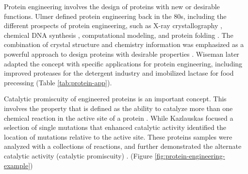 \begin{refsection}
Protein engineering involves the design of proteins with new or desirable
functions. Ulmer  defined protein engineering back
in the 80s, including the different prospects of protein engineering, such as
X-ray crystallography \cite{Takeda2006}, chemical DNA synthesis
\cite{Pannekoek1979}, computational modeling, and protein folding
\cite{Ulmer1983}. The combination of crystal structure and chemistry
information was emphasized as a powerful approach to design proteins with
desirable properties \cite{Ulmer1983}. Wiseman  later adapted the
concept with specific applications for protein engineering, including improved
proteases for the detergent industry \cite{Wiseman1993,Harwood1992} and
imobilized lactase for food precessing \cite{Wiseman1993} (Table
\ref{tab:protein-app}). 

Catalytic promiscuity of engineered proteins is an important concept. This
involves the property that is defined as the ability to catalyze more than one
chemical reaction in the active site of a protein \cite{Kazlauskas2005a}. While
Kazlauskas  focused a selection of single mutations that enhanced
catalytic activity identified the location of mutations relative to the active
site. These proteins samples were analyzed with a collections of reactions, and
further demonstrated the alternate catalytic activity (catalytic promiscuity)
\cite{Kazlauskas2005a}. (Figure \ref{fig:protein-engineering-example})

\end{refsection}
